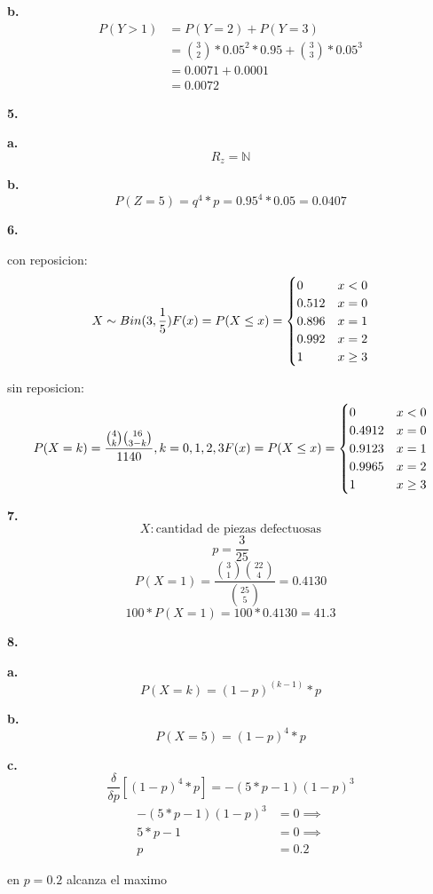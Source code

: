 \documentclass[12pt,fleqn]{article}
\begin{document}
\textbf{b.}
\begin{align*}
  P(Y>1)&=P(Y=2)+P(Y=3)\\
        &=\binom{3}{2}*0.05^2*0.95+\binom{3}{3}*0.05^3\\
        &=0.0071+0.0001\\
        &=0.0072
\end{align*}

\textbf{5.}

\textbf{a.}
\[R_z=\mathbb{N}\]

\textbf{b.}
\[P(Z=5)=q^4*p=0.95^4*0.05=0.0407\]

\textbf{6.}

con reposicion:
\[X \sim Bin(3,\frac{1}{5})\\
  F(x)=P(X \le x)=\begin{cases}
    0&x<0\\
    0.512&x=0\\
    0.896&x=1\\
    0.992&x=2\\
    1&x \ge 3
  \end{cases}
\]

sin reposicion:
\[P(X=k)=\frac{\binom{4}{k}\binom{16}{3-k}}{1140}, k=0,1,2,3\\
  F(x)=P(X \le x)=\begin{cases}
    0&x<0\\
    0.4912&x=0\\
    0.9123&x=1\\
    0.9965&x=2\\
    1&x \ge 3
  \end{cases}
\]

\textbf{7.}
\[X: \textrm{cantidad de piezas defectuosas}\]
\[p=\frac{3}{25}\]
\[P(X=1)=\frac{\binom{3}{1}\binom{22}{4}}{\binom{25}{5}}=0.4130\]
\[100*P(X=1)=100*0.4130=41.3\]

\textbf{8.}

\textbf{a.}
\[P(X=k)=(1-p)^{(k-1)}*p\]

\textbf{b.}
\[P(X=5)=(1-p)^4*p\]

\textbf{c.}
\[\frac{\delta}{\delta p}[(1-p)^4*p]=-(5*p-1)(1-p)^3\]
\begin{align*}
  -(5*p-1)(1-p)^3&=0\implies\\
  5*p-1&=0\implies\\
  p&=0.2
\end{align*}

en $p=0.2$ alcanza el maximo
\end{document}
